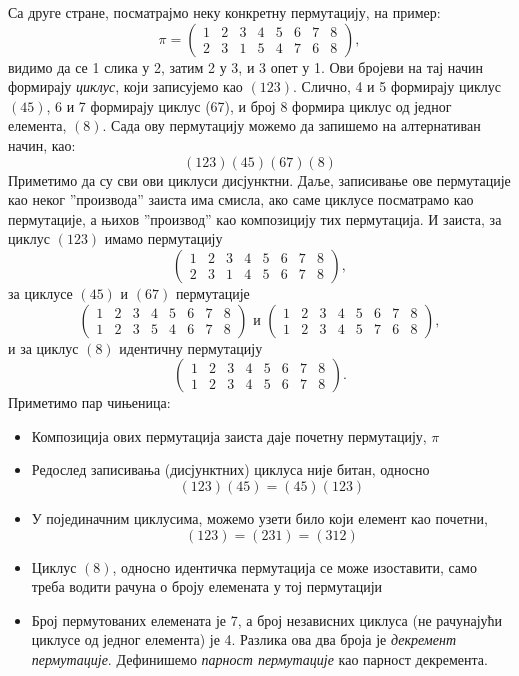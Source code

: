\documentclass{report}
\theoremstyle{plain}
\theoremstyle{definition}
\begin{document}
Са друге стране, посматрајмо неку конкретну пермутацију, на пример:
$$\pi = \begin{pmatrix}
    1 & 2 & 3 & 4 & 5 & 6 & 7 & 8 \\
    2 & 3 & 1 & 5 & 4 & 7 & 6 & 8
  \end{pmatrix},$$
видимо да се 1 слика у 2, затим 2 у 3, и 3 опет у 1. Ови бројеви на тај начин формирају \emph{циклус}, који записујемо као $(123)$. Слично, 4 и 5 формирају циклус $(45)$, 6 и 7 формирају циклус (67), и број 8 формира циклус од једног елемента, $(8)$. Сада ову пермутацију можемо да запишемо на алтернативан начин, као:
$$(123)(45)(67)(8)$$
Приметимо да су сви ови циклуси дисјунктни. Даље, записивање ове пермутације као неког ''производа'' заиста има смисла, ако саме циклусе посматрамо као пермутације, а њихов ''производ'' као композицију тих пермутација. И заиста, за циклус $(123)$ имамо пермутацију
$$\begin{pmatrix}
    1 & 2 & 3 & 4 & 5 & 6 & 7 & 8 \\
    2 & 3 & 1 & 4 & 5 & 6 & 7 & 8
  \end{pmatrix},$$
за циклусе $(45)$ и $(67)$ пермутације
$$\begin{pmatrix}
    1 & 2 & 3 & 4 & 5 & 6 & 7 & 8 \\
    1 & 2 & 3 & 5 & 4 & 6 & 7 & 8
  \end{pmatrix} \text{ и }
  \begin{pmatrix}
    1 & 2 & 3 & 4 & 5 & 6 & 7 & 8 \\
    1 & 2 & 3 & 4 & 5 & 7 & 6 & 8
  \end{pmatrix},$$
и за циклус $(8)$ идентичну пермутацију
$$\begin{pmatrix}
    1 & 2 & 3 & 4 & 5 & 6 & 7 & 8 \\
    1 & 2 & 3 & 4 & 5 & 6 & 7 & 8
  \end{pmatrix}.$$
Приметимо пар чињеница:
\begin{itemize}
  \item Композиција ових пермутација заиста даје почетну пермутацију, $\pi$
  \item Редослед записивања (дисјунктних) циклуса није битан, односно
  $$(123)(45) = (45)(123)$$
  \item У појединачним циклусима, можемо узети било који елемент као почетни,
  $$(123) = (231) = (312)$$
  \item Циклус $(8)$, односно идентичка пермутација се може изоставити, само треба водити рачуна о броју елемената у тој пермутацији
  \item Број пермутованих елемената је 7, а број независних циклуса (не рачунајући циклусе од једног елемента) је 4. Разлика ова два броја је \emph{декремент пермутације}. Дефинишемо \emph{парност пермутације} као парност декремента.
\end{itemize}
\end{document}

